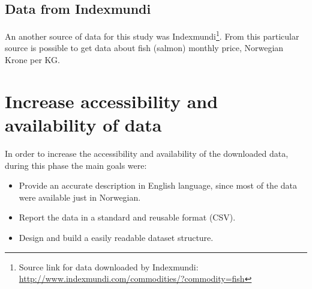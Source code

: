 \newpage


\subsection{Data from Indexmundi} 
An another source of data for this study was Indexmundi\footnote{Source link for data downloaded by Indexmundi: \\ \url{http://www.indexmundi.com/commodities/?commodity=fish}}. From this particular source is possible to get data about fish (salmon) monthly price, Norwegian Krone per KG.\\

\begin{table}[ht]
     \caption{Data provided from Indexmundi.}
    \label{table: Indemundi_Data} 
\end{table}  

\section{Increase accessibility and availability of data}
In order to increase the accessibility and availability of the downloaded data, during this phase the main goals were:
\vspace{-2mm}
\begin{itemize}
 \setlength{\itemsep}{-5pt}
\item Provide an accurate description in English language, since most of the data were available just in Norwegian.
\item Report the data in a standard and reusable format (CSV).
\item Design and build a easily readable dataset structure.
\end{itemize} 

